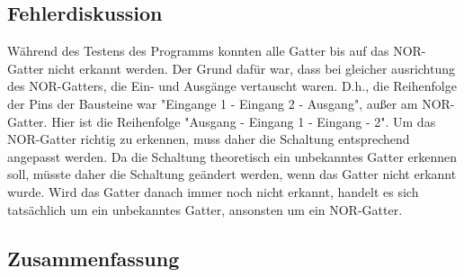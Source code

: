 \subsection{Fehlerdiskussion}
\label{subsec:a3-fehlerdiskussion}

Während des Testens des Programms konnten alle Gatter bis auf das NOR-Gatter nicht erkannt werden.
Der Grund dafür war, dass bei gleicher ausrichtung des NOR-Gatters, die Ein- und Ausgänge vertauscht waren.
D.h., die Reihenfolge der Pins der Bausteine war "Eingange 1 - Eingang 2 - Ausgang", außer am NOR-Gatter.
Hier ist die Reihenfolge "Ausgang - Eingang 1 - Eingang - 2".
Um das NOR-Gatter richtig zu erkennen, muss daher die Schaltung entsprechend angepasst werden.
Da die Schaltung theoretisch ein unbekanntes Gatter erkennen soll, müsste daher die Schaltung geändert werden, wenn das Gatter nicht erkannt wurde.
Wird das Gatter danach immer noch nicht erkannt, handelt es sich tatsächlich um ein unbekanntes Gatter, ansonsten um ein NOR-Gatter.

\subsection{Zusammenfassung}
\label{subsec:a3-zusammenfassung2}

